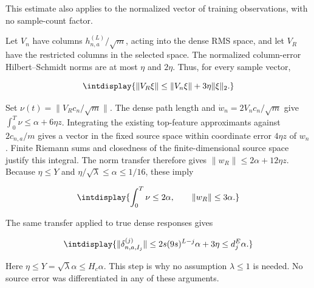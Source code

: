 
This estimate also applies to the normalized vector of training observations, with no sample-count factor.



Let \(V_n\) have columns \(h_{n,\allowbreak a}^{(L)}/\sqrt m\), acting into the dense RMS space, and let \(V_R\) have the restricted columns in the selected space. The normalized column-error Hilbert--Schmidt norms are at most \(\eta\) and \(2\eta\). Thus, for every sample vector,


\begingroup\renewcommand{\theHequation}{intdisplay.581}
\begin{equation*}
\intdisplay{
\|V_R\xi\|\le\|V_n\xi\|+3\eta\|\xi\|_2.
}
\end{equation*}
\endgroup


Set \(\nu(t)=\|V_Rc_n/\sqrt m\|\). The dense path length and \(\dot w_n=2V_nc_n/\sqrt m\) give \(\int_0^T\nu\le\alpha+6\eta z\). Integrating the existing top-feature approximants against \(2c_{n,\allowbreak a}/m\) gives a vector in the fixed source space within coordinate error \(4\eta z\) of \(w_n\). Finite Riemann sums and closedness of the finite-dimensional source space justify this integral. The norm transfer therefore gives \(\|w_R\|\le2\alpha+12\eta z\). Because \(\eta\le Y\) and \(\eta/\sqrt\lambda\le\alpha\le1/16\), these imply


\begingroup\renewcommand{\theHequation}{intdisplay.582}
\begin{equation}
\intdisplay{
\int_0^T\nu\le2\alpha,\qquad \|w_R\|\le3\alpha.
}
\label{int:eq-0245-harmonic-selected-readout-energy}
\end{equation}
\endgroup


The same transfer applied to true dense responses gives


\begingroup\renewcommand{\theHequation}{intdisplay.583}
\begin{equation}
\intdisplay{
\|\delta_{n,a,I_j}^{(j)}\|
 \le2s(9s)^{L-j}\alpha+3\eta\le d_j^E\alpha.
}
\label{int:eq-0246-harmonic-selected-response-energy}
\end{equation}
\endgroup


Here \(\eta\le Y=\sqrt\lambda\alpha\le H_c\alpha\). This step is why no assumption \(\lambda\le1\) is needed. No source error was differentiated in any of these arguments.


